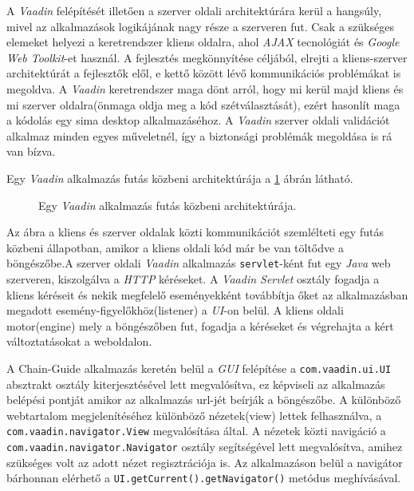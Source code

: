 \par A \textit{Vaadin} felépítését illetően a szerver oldali architektúrára kerül a hangsúly, mivel az alkalmazások logikájának nagy része a szerveren fut. Csak a szükséges elemeket helyezi a keretrendszer kliens oldalra, ahol \textit{AJAX} tecnológiát és \textit{Google Web Toolkit}-et  használ. A fejlesztés megkönnyítése céljából, elrejti a kliens-szerver architektúrát a fejlesztők elől, e kettő között lévő kommunikációs problémákat is megoldva. A \textit{Vaadin} keretrendszer maga dönt arról, hogy mi kerül majd kliens és mi szerver oldalra(önmaga oldja meg a kód szétválasztását), ezért hasonlít maga a kódolás egy sima desktop alkalmazáséhoz. A \textit{Vaadin} szerver oldali validációt alkalmaz minden egyes műveletnél, így a biztonsági problémák megoldása is rá van bízva.


 Egy \textit{Vaadin} alkalmazás futás közbeni architektúrája a \ref{fig:FELH:kep3} ábrán látható.

\begin{figure}[h!]
  \centering
  \caption[Vaadin alkalmazás architektúra]%
  {Egy \textit{Vaadin} alkalmazás futás közbeni architektúrája.}
  \label{fig:FELH:kep3}
\end{figure}

\par Az ábra a kliens és szerver oldalak közti kommunikációt szemlélteti egy futás közbeni állapotban, amikor a kliens oldali kód már be van töltődve a böngészőbe.A szerver oldali \textit{Vaadin} alkalmazás {\tt servlet}-ként fut egy \textit{Java} web szerveren, kiszolgálva a \textit{HTTP} kéréseket. A \textit{Vaadin Servlet} osztály fogadja a kliens kéréseit és  nekik megfelelő eseményekként továbbítja őket az alkalmazásban megadott esemény-figyelőkhöz(listener) a \textit{UI}-on belül.  A kliens oldali motor(engine) mely a böngészőben fut, fogadja a kéréseket és végrehajta a kért változtatásokat a weboldalon.

\par A Chain-Guide alkalmazás keretén belül a \textit{GUI} felépítése a  {\tt com.vaadin.ui.UI} absztrakt osztály kiterjesztésével lett megvalósítva, ez képviseli az alkalmazás belépési pontját amikor az alkalmazás url-jét beírják a böngészőbe. A különböző webtartalom megjelenítéséhez különböző nézetek(view) lettek felhasználva, a {\tt com.vaadin.navigator.View} megvalósítása által. A nézetek közti navigáció a {\tt com.vaadin.navigator.Navigator} osztály segítségével lett megvalósítva, amihez szükséges volt az adott nézet regisztrációja is. Az alkalmazáson belül a navigátor bárhonnan elérhető a {\tt UI.getCurrent().getNavigator()}  metódus meghívásával.




